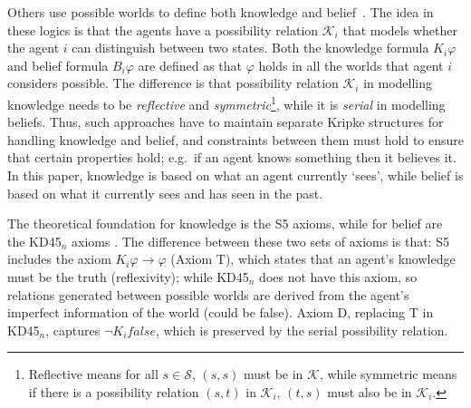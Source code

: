 Others use possible worlds to define both knowledge and belief~\cite{stalnaker2006logics,Fagin:2003:RK:995831}.
The idea in these logics is that the agents have a possibility relation $\mathcal{K}_i$ that models whether the agent $i$ can distinguish between two states.
Both the knowledge formula $K_i \varphi$ and belief formula $B_i \varphi$ are defined as that $\varphi$ holds in all the worlds that agent $i$ considers possible.
The difference is that possibility relation $\mathcal{K}_i$ in modelling knowledge needs to be \emph{reflective} and \emph{symmetric}\footnote{Reflective means for all $s\in \mathcal{S}$, $(s,s)$ must be in $\mathcal{K}$, while symmetric means if there is a possibility relation $(s,t)$ in $\mathcal{K}_i$, $(t,s)$ must also be in $\mathcal{K}_i$.}, while it is \emph{serial} in modelling beliefs.
Thus, such approaches have to maintain separate Kripke structures for handling knowledge and belief, and constraints between them must hold to ensure that certain properties hold; e.g.\ if an agent knows something then it believes it. In this paper, knowledge is based on what an agent currently `sees', while belief is based on what it currently sees and has  seen in the past.


The theoretical foundation for knowledge is the S5 axioms, while for belief are the KD45$_n$ axioms \cite{Fagin:2003:RK:995831}.
The difference between these two sets of axioms is that: 
S5 includes the axiom $K_i \varphi \rightarrow \varphi$ (Axiom T), which states that an agent's knowledge must be the truth (reflexivity); 
while KD45$_n$ does not have this axiom, so relations generated between possible worlds are derived from the agent's imperfect information of the world (could be false).
Axiom D, replacing T in KD45$_n$, captures $\neg K_i false$, which is preserved by the serial possibility relation.

